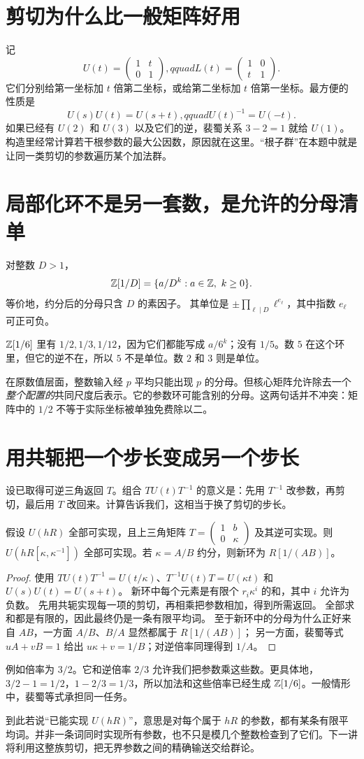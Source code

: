\section{剪切为什么比一般矩阵好用}
记
\[U(t)=\begin{pmatrix}1&t\\0&1\end{pmatrix},qquad
L(t)=\begin{pmatrix}1&0\\t&1\end{pmatrix}.
\]
它们分别给第一坐标加 $t$ 倍第二坐标，或给第二坐标加 $t$ 倍第一坐标。最方便的性质是
\[U(s)U(t)=U(s+t),qquad U(t)^{-1}=U(-t).
\]
如果已经有 $U(2)$ 和 $U(3)$ 以及它们的逆，裴蜀关系 $3-2=1$ 就给 $U(1)$。构造里经常计算若干根参数的最大公因数，原因就在这里。“根子群”在本题中就是让同一类剪切的参数遍历某个加法群。

\section{局部化环不是另一套数，是允许的分母清单}
\begin{definition}[整数的有限局部化]
对整数 $D>1$，
\[
\mathbb Z[1/D]=\{a/D^k:a\in\mathbb Z,\ k\ge0\}.
\]
等价地，约分后的分母只含 $D$ 的素因子。
其单位是 $\pm\prod_{\ell\mid D}\ell^{e_\ell}$，其中指数 $e_\ell$ 可正可负。
\end{definition}
$\mathbb Z[1/6]$ 里有 $1/2,1/3,1/12$，因为它们都能写成 $a/6^k$；没有 $1/5$。数 $5$ 在这个环里，但它的逆不在，所以 $5$ 不是单位。数 $2$ 和 $3$ 则是单位。

在原数值层面，整数输入经 $p$ 平均只能出现 $p$ 的分母。但核心矩阵允许除去一个\emph{整个配置的}共同尺度后表示。它的参数环可能含别的分母。这两句话并不冲突：矩阵中的 $1/2$ 不等于实际坐标被单独免费除以二。

\section{用共轭把一个步长变成另一个步长}
设已取得可逆三角返回 $T$。组合 $TU(t)T^{-1}$ 的意义是：先用 $T^{-1}$ 改参数，再剪切，最后用 $T$ 改回来。计算告诉我们，这相当于换了剪切的步长。
\begin{lemma}[可逆倍率扩展剪切参数]\label{lem:localize}
假设 $U(hR)$ 全部可实现，且上三角矩阵 $T=\left(\begin{smallmatrix}1&b\\0&\kappa\end{smallmatrix}\right)$ 及其逆可实现。则 $U(hR[\kappa,\kappa^{-1}])$ 全部可实现。若 $\kappa=A/B$ 约分，则新环为 $R[1/(AB)]$。
\end{lemma}
\begin{proof}
使用 $TU(t)T^{-1}=U(t/\kappa)$、$T^{-1}U(t)T=U(\kappa t)$ 和 $U(s)U(t)=U(s+t)$。
新环中每个元素是有限个 $r_i\kappa^i$ 的和，其中 $i$ 允许为负数。
先用共轭实现每一项的剪切，再相乘把参数相加，得到所需返回。
全部求和都是有限的，因此最终仍是一条有限平均词。
至于新环中的分母为什么正好来自 $AB$，一方面 $A/B$、$B/A$ 显然都属于 $R[1/(AB)]$；
另一方面，裴蜀等式 $uA+vB=1$ 给出 $u\kappa+v=1/B$；对逆倍率同理得到 $1/A$。
\end{proof}
例如倍率为 $3/2$。它和逆倍率 $2/3$ 允许我们把参数乘这些数。更具体地，$3/2-1=1/2$，$1-2/3=1/3$，所以加法和这些倍率已经生成 $\mathbb Z[1/6]$。一般情形中，裴蜀等式承担同一任务。

到此若说“已能实现 $U(hR)$”，意思是对每个属于 $hR$ 的参数，都有某条有限平均词。并非一条词同时实现所有参数，也不只是模几个整数检查到了它们。下一讲将利用这整族剪切，把无界参数之间的精确输送交给群论。
